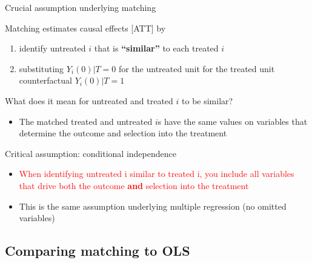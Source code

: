 \begin{frame}{Crucial assumption underlying matching}

	
	Matching estimates causal effects [ATT] by
	\begin{enumerate}
		\item identify untreated $i$ that is \textbf{``similar''} to each treated $i$
		\item substituting $Y_i(0)|T=0$ for the untreated unit for the treated unit counterfactual $Y_i(0)|T=1$
	\end{enumerate}
	
	\vspace{2mm}
	
	What does it mean for untreated and treated $i$ to be similar?
	\begin{itemize}
		\item The matched treated and untreated $i$s have the same values on variables that determine the outcome and selection into the treatment 
	\end{itemize}
	
	\vspace{2mm}
	Critical assumption: conditional independence
	\begin{itemize}
		\item \textcolor{red}{When identifying untreated i similar to treated i, you include all variables that drive both the outcome \textbf{and} selection into the treatment}
		\item This is the same assumption underlying multiple regression (no omitted variables)	
	\end{itemize}


\end{frame}


\subsection[Matching vs. OLS]{Comparing matching to OLS}

